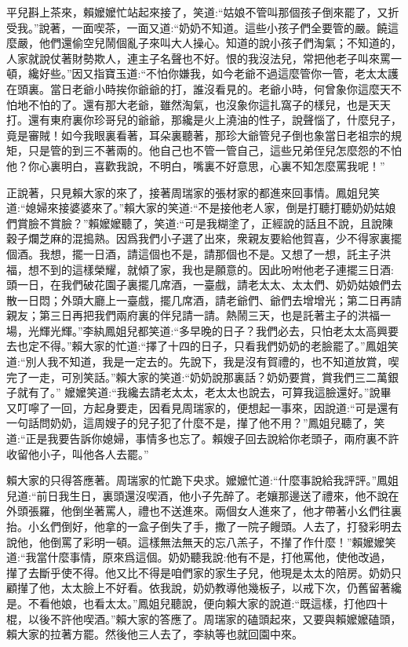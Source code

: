 \begin{parag}
    平兒斟上茶來，賴嬤嬤忙站起來接了，笑道:“姑娘不管叫那個孩子倒來罷了，又折受我。”說著，一面喫茶，一面又道:“奶奶不知道。這些小孩子們全要管的嚴。饒這麼嚴，他們還偷空兒鬧個亂子來叫大人操心。知道的說小孩子們淘氣；不知道的，人家就說仗著財勢欺人，連主子名聲也不好。恨的我沒法兒，常把他老子叫來罵一頓，纔好些。”因又指寶玉道:“不怕你嫌我，如今老爺不過這麼管你一管，老太太護在頭裏。當日老爺小時挨你爺爺的打，誰沒看見的。老爺小時，何曾象你這麼天不怕地不怕的了。還有那大老爺，雖然淘氣，也沒象你這扎窩子的樣兒，也是天天打。還有東府裏你珍哥兒的爺爺，那纔是火上澆油的性子，說聲惱了，什麼兒子，竟是審賊！如今我眼裏看著，耳朵裏聽著，那珍大爺管兒子倒也象當日老祖宗的規矩，只是管的到三不著兩的。他自己也不管一管自己，這些兄弟侄兒怎麼怨的不怕他？你心裏明白，喜歡我說，不明白，嘴裏不好意思，心裏不知怎麼罵我呢！”
\end{parag}


\begin{parag}
    正說著，只見賴大家的來了，接著周瑞家的張材家的都進來回事情。鳳姐兒笑道:“媳婦來接婆婆來了。”賴大家的笑道:“不是接他老人家，倒是打聽打聽奶奶姑娘們賞臉不賞臉？”賴嬤嬤聽了，笑道:“可是我糊塗了，正經說的話且不說，且說陳穀子爛芝麻的混搗熟。因爲我們小子選了出來，衆親友要給他賀喜，少不得家裏擺個酒。我想，擺一日酒，請這個也不是，請那個也不是。又想了一想，託主子洪福，想不到的這樣榮耀，就傾了家，我也是願意的。因此吩咐他老子連擺三日酒:頭一日，在我們破花園子裏擺几席酒，一臺戲，請老太太、太太們、奶奶姑娘們去散一日悶；外頭大廳上一臺戲，擺几席酒，請老爺們、爺們去增增光；第二日再請親友；第三日再把我們兩府裏的伴兒請一請。熱鬧三天，也是託著主子的洪福一場，光輝光輝。”李紈鳳姐兒都笑道:“多早晚的日子？我們必去，只怕老太太高興要去也定不得。”賴大家的忙道:“擇了十四的日子，只看我們奶奶的老臉罷了。”鳳姐笑道:“別人我不知道，我是一定去的。先說下，我是沒有賀禮的，也不知道放賞，喫完了一走，可別笑話。”賴大家的笑道:“奶奶說那裏話？奶奶要賞，賞我們三二萬銀子就有了。” 嬤嬤笑道:“我纔去請老太太，老太太也說去，可算我這臉還好。”說畢又叮嚀了一回，方起身要走，因看見周瑞家的，便想起一事來，因說道:“可是還有一句話問奶奶，這周嫂子的兒子犯了什麼不是，攆了他不用？”鳳姐兒聽了，笑道:“正是我要告訴你媳婦，事情多也忘了。賴嫂子回去說給你老頭子，兩府裏不許收留他小子，叫他各人去罷。”
\end{parag}


\begin{parag}
    賴大家的只得答應著。周瑞家的忙跪下央求。嬤嬤忙道:“什麼事說給我評評。”鳳姐兒道:“前日我生日，裏頭還沒喫酒，他小子先醉了。老孃那邊送了禮來，他不說在外頭張羅，他倒坐著罵人，禮也不送進來。兩個女人進來了，他才帶著小幺們往裏抬。小幺們倒好，他拿的一盒子倒失了手，撒了一院子饅頭。人去了，打發彩明去說他，他倒罵了彩明一頓。這樣無法無天的忘八羔子，不攆了作什麼！”賴嬤嬤笑道:“我當什麼事情，原來爲這個。奶奶聽我說:他有不是，打他罵他，使他改過，攆了去斷乎使不得。他又比不得是咱們家的家生子兒，他現是太太的陪房。奶奶只顧攆了他，太太臉上不好看。依我說，奶奶教導他幾板子，以戒下次，仍舊留著纔是。不看他娘，也看太太。”鳳姐兒聽說，便向賴大家的說道:“既這樣，打他四十棍，以後不許他喫酒。”賴大家的答應了。周瑞家的磕頭起來，又要與賴嬤嬤磕頭，賴大家的拉著方罷。然後他三人去了，李紈等也就回園中來。
\end{parag}


